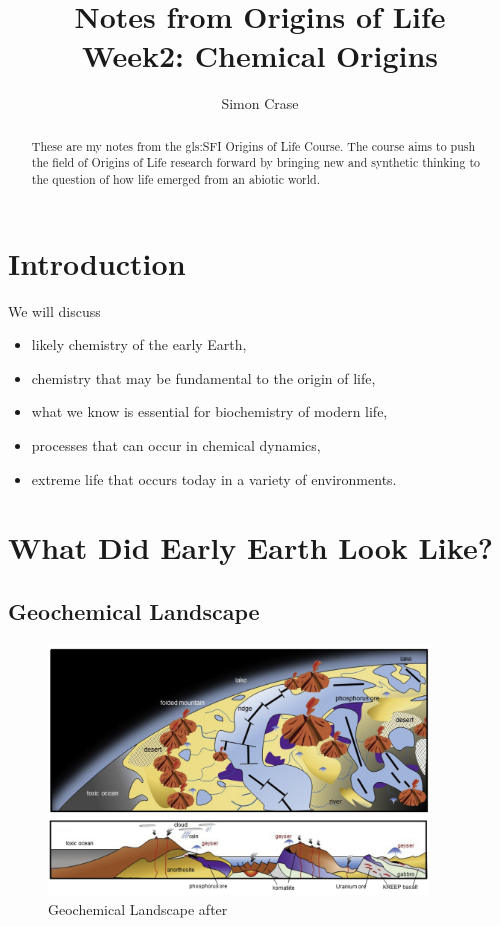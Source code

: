 \documentclass[]{article}
\title{
	Notes from Origins of Life\\
	Week2: Chemical Origins
}
\author{Simon Crase}
\begin{document}
\maketitle

\begin{abstract}
    These are my notes from the \gls{gls:SFI} Origins of Life Course\cite{sfi2019}. The course aims to push the field of Origins of Life research forward by bringing new and synthetic thinking to the question of how life emerged from an abiotic world.

\end{abstract}

\setcounter{tocdepth}{2}
\tableofcontents

\section{Introduction}

We will discuss 
\begin{itemize}
	\item likely chemistry of the early Earth,
	\item chemistry that may be  fundamental to the origin of life,
	\item what we know is essential for biochemistry of modern life,
	\item processes that can occur in chemical dynamics, 
	\item extreme life that occurs today in a variety of environments.
\end{itemize}


\section{What Did Early Earth Look Like?}

\subsection{Geochemical Landscape}
\begin{figure}[h!]
	\caption{Geochemical Landscape after \cite{kitadai2018origins}}
	\includegraphics[width=0.9\textwidth]{GeochemicalLandscape}
\end{figure}
\end{document}
